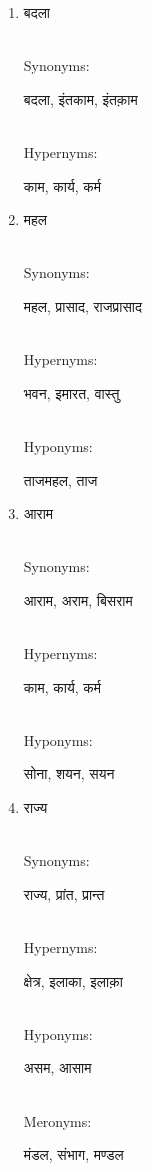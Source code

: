 \documentclass{article}
\begin{document}
\begin{enumerate}
\item \begin{hindi}बदला\end{hindi} \\
Synonyms: \begin{hindi}बदला, इंतकाम, इंतक़ाम\end{hindi} \\
Hypernyms: \begin{hindi}काम, कार्य, कर्म\end{hindi}

\item \begin{hindi}महल\end{hindi} \\
Synonyms: \begin{hindi}महल, प्रासाद, राजप्रासाद\end{hindi} \\
Hypernyms: \begin{hindi}भवन, इमारत, वास्तु\end{hindi} \\
Hyponyms: \begin{hindi}ताजमहल, ताज\end{hindi}

\item \begin{hindi}आराम\end{hindi} \\
Synonyms: \begin{hindi}आराम, अराम, बिसराम\end{hindi} \\
Hypernyms: \begin{hindi}काम, कार्य, कर्म\end{hindi} \\
Hyponyms: \begin{hindi}सोना, शयन, सयन\end{hindi}

\item \begin{hindi}राज्य\end{hindi} \\
Synonyms: \begin{hindi}राज्य, प्रांत, प्रान्त\end{hindi} \\
Hypernyms: \begin{hindi}क्षेत्र, इलाका, इलाक़ा\end{hindi} \\
Hyponyms: \begin{hindi}असम, आसाम\end{hindi} \\
Meronyms: \begin{hindi}मंडल, संभाग, मण्डल\end{hindi}


\end{enumerate}
\end{document}
